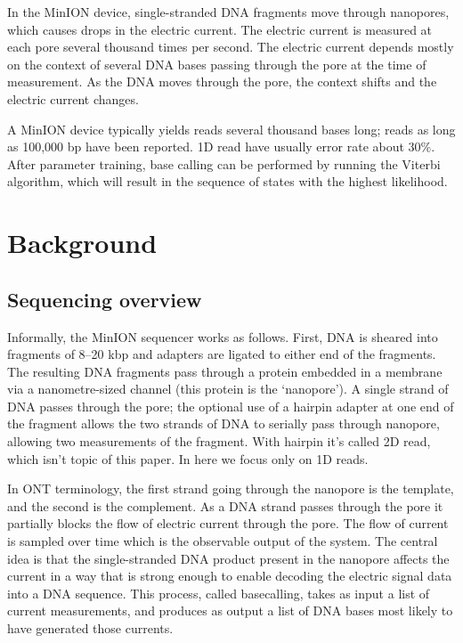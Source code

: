 \documentclass[times, utf8, seminar]{fer}
\begin{document}
In the MinION device, single-stranded DNA fragments move through nanopores, which causes drops in the electric current. The electric current is measured at each pore several thousand times per second. The electric current depends mostly on the context of several DNA bases passing through the pore at the time of measurement. As the DNA moves through the pore, the context shifts and the electric current changes.

A MinION device typically yields reads several thousand bases long; reads as long as 100,000 bp have been reported. 1D read have usually error rate about   30\%. After parameter training, base calling can be performed by running the Viterbi algorithm, which will result in the sequence of states with the highest likelihood.

\chapter{Background}

\section{Sequencing overview}
Informally, the MinION sequencer works as follows. First, DNA is sheared into fragments of 8–20 kbp and adapters are ligated to either end of the fragments. The resulting DNA fragments pass through a protein embedded in a membrane via a nanometre-sized channel (this protein is the `nanopore'). A single strand of DNA passes through the pore; the optional use of a hairpin adapter at one end of the fragment allows the two strands of DNA to serially pass through nanopore, allowing two measurements of the fragment. With hairpin it's called 2D read, which isn't topic of this paper. In here we focus only on 1D reads.

In ONT terminology, the first strand going through the nanopore is the template, and the second is the complement. As a DNA strand passes through the pore it partially blocks the flow of electric current through the pore. The flow of current is sampled over time which is the observable output of the system. The central idea is that the single-stranded DNA product present in the nanopore affects the current in a way that is strong enough to enable decoding the electric signal data into a DNA sequence. This process, called basecalling, takes as input a list of current measurements, and produces as output a list of DNA bases most likely to have generated those currents.
\end{document}
